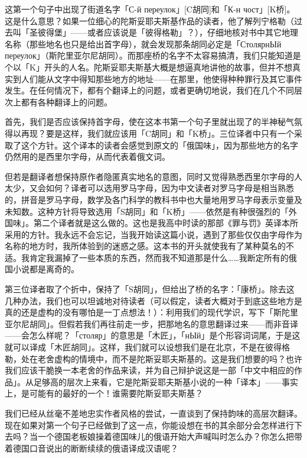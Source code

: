 \documentclass[
  12pt,
  twoside,
  openright,
  oldfontcommands,
]{memoir}
\begin{document}
这第一个句子中出现了街道名字「С-й переулок」{[}C胡同{]}和「К-н
чост」{[}K桥{]}。这是什么意思？如果一位细心的陀斯妥耶夫斯基作品的读者，他了解列宁格勒（过去叫「圣彼得堡」------或者应该说是「彼得格勒」？），仔细地核对书中其它地理名称（那些地名也只是给出首字母），就会发现那条胡同必定是「СтолярнЫй
переулок」（斯陀里亚尔尼胡同）。而那座桥的名字不太容易搞清，我们只能知道是个以「K」开头的人名。陀斯妥耶夫斯基大概是想逼真地讲他的故事，但并不想真实到人们能从文字中得知那些地方的地址------在那里，他使得种种罪行及其它事件发生。在任何情况下，都有个翻译上的问题，或者更确切地说，我们在几个不同层次上都有各种翻译上的问题。

首先，我们是否应该保持首字母，使在这本书第一个句子里就出现了的半神秘气氛得以再现？要是这样，我们就应该用「C胡同」和「K桥」。三位译者中只有一个采取了这个方针。这个译本的读者会感觉到原文的「俄国味」，因为那些地方的名字仍然用的是西里尔字母，从而代表着俄文词。

但若是翻译者想保持原作者隐匿真实地名的意图，同时又觉得熟悉西里尔字母的人太少，又会如何？译者可以选用罗马字母，因为中文读者对罗马字母是相当熟悉的，拼音是罗马字母，数学及各门科学的教科书中也大量地用罗马字母表示变量及未知数。这种方针将导致选用「S胡同」和「K桥」------依然是有种很强烈的「外国味」。第二个译者就是这么做的。这也是我高中时读的那部《罪与罚》英译本所采用的方针。我永远不会忘记，当我开始读这篇小说，遇到了那些仅仅由字母作为名称的地方时，我所体验到的迷惑之感。这本书的开头就使我有了某种莫名的不适。我肯定我漏掉了一些本质的东西，然而我不知道那是什么\ldots\ldots 我断定所有的俄国小说都是离奇的。

第三位译者取了个折中，保持了「S胡同」，但给出了桥的名字：「康桥」。除去这几种办法，我们也可以坦诚地对待读者（可以假定，读者大概对于到底这些地方是真的还是虚构的没有哪怕是一丁点想法！）：利用我们的现代学识，写下「斯陀里亚尔尼胡同」。但假若我们再往前走一步，把那地名的意思翻译过来------而非音译------会怎么样呢？「столяр」的意思是「木匠」，「нЫй」是个形容词词尾，于是这就可以译成「木匠胡同」。这样，我们就可以设想我们是在北京，不是在彼得格勒，处在老舍虚构的情境中，而不是陀斯妥耶夫斯基的。这是我们想要的吗？也许我们应该干脆换一本老舍的作品来读，并为自己辩护说这是一部「中文中相应的作品」。从足够高的层次上来看，它是陀斯妥耶夫斯基小说的一种「译本」------事实上，是可能有的最好的一个！谁需要陀斯妥耶夫斯基？

我们已经从丝毫不差地忠实作者风格的尝试，一直谈到了保持韵味的高层次翻译。现在如果对第一个句子已经做到了这一点，你能设想在书的其余部分会怎样进行下去吗？当一个德国老板娘操着德国味儿的俄语开始大声喊叫时怎么办？你怎么把带着德国口音说出的断断续续的俄语译成汉语呢？
\end{document}
